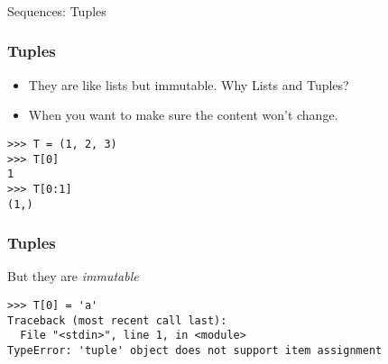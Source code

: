 \begin{frame}[fragile]\frametitle{}
\vspace{1in}
\begin{center}
{\Large Sequences: Tuples}
\end{center}
\end{frame}



\begin{frame}[fragile]\frametitle{Tuples}
  \begin{itemize}
  \item They are like lists but immutable. Why Lists and Tuples?
  \item When you want to make sure the content won't change.
  \end{itemize}
  \begin{lstlisting}
>>> T = (1, 2, 3)
>>> T[0]
1
>>> T[0:1]
(1,)
  \end{lstlisting}

\end{frame}



\begin{frame}[fragile]\frametitle{Tuples}
But they are \textit{immutable}

\begin{lstlisting}[basicstyle=\footnotesize\ttfamily]
>>> T[0] = 'a'
Traceback (most recent call last):
  File "<stdin>", line 1, in <module>
TypeError: 'tuple' object does not support item assignment
\end{lstlisting}
\end{frame}
%
%
%
%
%
%
%
%
%	
%
%	
%
%

